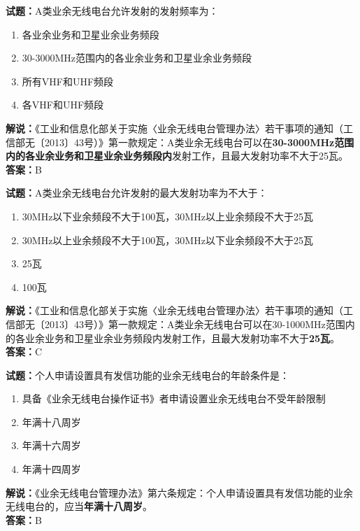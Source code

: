 \documentclass{ctexbook}
\begin{document}
\bigskip


\noindent\textbf{试题：}A类业余无线电台允许发射的发射频率为：
\begin{enumerate}[leftmargin=3em]
	\item 各业余业务和卫星业余业务频段
	\item 30-3000MHz范围内的各业余业务和卫星业余业务频段
	\item 所有VHF和UHF频段
	\item 各VHF和UHF频段
\end{enumerate}
\noindent\textbf{解说：}《工业和信息化部关于实施〈业余无线电台管理办法〉若干事项的通知（工信部无〔2013〕43号）》第一款规定：A类业余无线电台可以在\textbf{30-3000MHz范围内的各业余业务和卫星业余业务频段内}发射工作，且最大发射功率不大于25瓦。\\\noindent\textbf{答案：}B


\bigskip


\noindent\textbf{试题：}A类业余无线电台允许发射的最大发射功率为不大于：
\begin{enumerate}[leftmargin=3em]
	\item 30MHz以下业余频段不大于100瓦，30MHz以上业余频段不大于25瓦
	\item 30MHz以上业余频段不大于100瓦，30MHz以下业余频段不大于25瓦
	\item 25瓦
	\item 100瓦
\end{enumerate}
\noindent\textbf{解说：}《工业和信息化部关于实施〈业余无线电台管理办法〉若干事项的通知（工信部无〔2013〕43号）》第一款规定：A类业余无线电台可以在30-1000MHz范围内的各业余业务和卫星业余业务频段内发射工作，且最大发射功率不大于\textbf{25瓦}。\\\noindent\textbf{答案：}C


\bigskip


\noindent\textbf{试题：}个人申请设置具有发信功能的业余无线电台的年龄条件是：
\begin{enumerate}[leftmargin=3em]
	\item 具备《业余无线电台操作证书》者申请设置业余无线电台不受年龄限制
	\item 年满十八周岁
	\item 年满十六周岁
	\item 年满十四周岁
\end{enumerate}
\noindent\textbf{解说：}《业余无线电台管理办法》第六条规定：个人申请设置具有发信功能的业余无线电台的，应当\textbf{年满十八周岁}。\\\noindent\textbf{答案：}B


\bigskip
\end{document}
